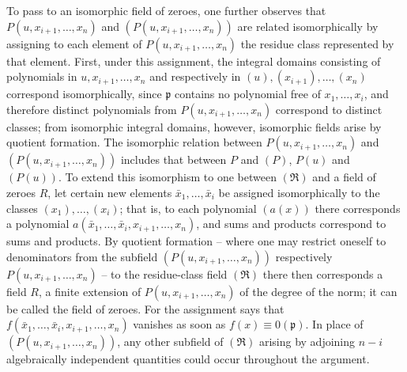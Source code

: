 \documentclass[11pt]{article}
\providecommand{\mR}{\mathfrak{R}}
\providecommand{\frakp}{\mathfrak p}
\providecommand{\mR}{\mathfrak{R}}
\providecommand{\frakp}{\mathfrak p}
\providecommand{\frakp}{\mathfrak p}
\begin{document}
To pass to an isomorphic field of zeroes, one further observes that $P(u,x_{i+1},\ldots,x_n)$ and $(P(u,x_{i+1},\ldots,x_n))$ are related isomorphically by assigning to each element of $P(u,x_{i+1},\ldots,x_n)$ the residue class represented by that element. First, under this assignment, the integral domains consisting of polynomials in $u,x_{i+1},\ldots,x_n$ and respectively in $(u),(x_{i+1}),\ldots,(x_n)$ correspond isomorphically, since $\frakp$ contains no polynomial free of $x_1,\ldots,x_i$, and therefore distinct polynomials from $P(u,x_{i+1},\ldots,x_n)$ correspond to distinct classes; from isomorphic integral domains, however, isomorphic fields arise by quotient formation. The isomorphic relation between $P(u,x_{i+1},\ldots,x_n)$ and $(P(u,x_{i+1},\ldots,x_n))$ includes that between $P$ and $(P)$, $P(u)$ and $(P(u))$. To extend this isomorphism to one between $(\mR)$ and a field of zeroes $R$, let certain new elements $\bar{x}_1,\ldots,\bar{x}_i$ be assigned isomorphically to the classes $(x_1),\ldots,(x_i)$; that is, to each polynomial $(a(x))$ there corresponds a polynomial $a(\bar{x}_1,\ldots,\bar{x}_i,x_{i+1},\ldots,x_n)$, and sums and products correspond to sums and products. By quotient formation -- where one may restrict oneself to denominators from the subfield $(P(u,x_{i+1},\ldots,x_n))$ respectively $P(u,x_{i+1},\ldots,x_n)$ -- to the residue-class field $(\mR)$ there then corresponds a field $R$, a finite extension of $P(u,x_{i+1},\ldots,x_n)$ of the degree of the norm; it can be called the field of zeroes. For the assignment says that $f(\bar{x}_1,\ldots,\bar{x}_i,x_{i+1},\ldots,x_n)$ vanishes as soon as $f(x)\equiv0(\frakp)$. In place of $(P(u,x_{i+1},\ldots,x_n))$, any other subfield of $(\mR)$ arising by adjoining $n-i$ algebraically independent quantities could occur throughout the argument.
\end{document}
